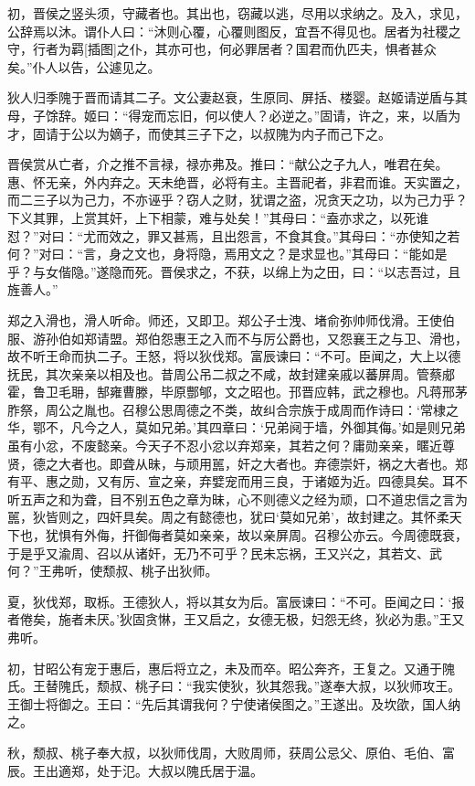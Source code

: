 \documentclass[a4paper,12pt,UTF8,twoside]{ctexbook}
\begin{document}
初，晋侯之竖头须，守藏者也。其出也，窃藏以逃，尽用以求纳之。及入，求见，公辞焉以沐。谓仆人曰：“沐则心覆，心覆则图反，宜吾不得见也。居者为社稷之守，行者为羁[插图]之仆，其亦可也，何必罪居者？国君而仇匹夫，惧者甚众矣。”仆人以告，公遽见之。

狄人归季隗于晋而请其二子。文公妻赵衰，生原同、屏括、楼婴。赵姬请逆盾与其母，子馀辞。姬曰：“得宠而忘旧，何以使人？必逆之。”固请，许之，来，以盾为才，固请于公以为嫡子，而使其三子下之，以叔隗为内子而己下之。

晋侯赏从亡者，介之推不言禄，禄亦弗及。推曰：“献公之子九人，唯君在矣。惠、怀无亲，外内弃之。天未绝晋，必将有主。主晋祀者，非君而谁。天实置之，而二三子以为己力，不亦诬乎？窃人之财，犹谓之盗，况贪天之功，以为己力乎？下义其罪，上赏其奸，上下相蒙，难与处矣！”其母曰：“盍亦求之，以死谁怼？”对曰：“尤而效之，罪又甚焉，且出怨言，不食其食。”其母曰：“亦使知之若何？”对曰：“言，身之文也，身将隐，焉用文之？是求显也。”其母曰：“能如是乎？与女偕隐。”遂隐而死。晋侯求之，不获，以绵上为之田，曰：“以志吾过，且旌善人。”

郑之入滑也，滑人听命。师还，又即卫。郑公子士洩、堵俞弥帅师伐滑。王使伯服、游孙伯如郑请盟。郑伯怨惠王之入而不与厉公爵也，又怨襄王之与卫、滑也，故不听王命而执二子。王怒，将以狄伐郑。富辰谏曰：“不可。臣闻之，大上以德抚民，其次亲亲以相及也。昔周公吊二叔之不咸，故封建亲戚以蕃屏周。管蔡郕霍，鲁卫毛耼，郜雍曹滕，毕原酆郇，文之昭也。邘晋应韩，武之穆也。凡蒋邢茅胙祭，周公之胤也。召穆公思周德之不类，故纠合宗族于成周而作诗曰：‘常棣之华，鄂不，凡今之人，莫如兄弟。’其四章曰：‘兄弟阋于墙，外御其侮。’如是则兄弟虽有小忿，不废懿亲。今天子不忍小忿以弃郑亲，其若之何？庸勋亲亲，暱近尊贤，德之大者也。即聋从昧，与顽用嚚，奸之大者也。弃德崇奸，祸之大者也。郑有平、惠之勋，又有厉、宣之亲，弃嬖宠而用三良，于诸姬为近。四德具矣。耳不听五声之和为聋，目不别五色之章为昧，心不则德义之经为顽，口不道忠信之言为嚚，狄皆则之，四奸具矣。周之有懿德也，犹曰‘莫如兄弟’，故封建之。其怀柔天下也，犹惧有外侮，扞御侮者莫如亲亲，故以亲屏周。召穆公亦云。今周德既衰，于是乎又渝周、召以从诸奸，无乃不可乎？民未忘祸，王又兴之，其若文、武何？”王弗听，使颓叔、桃子出狄师。

夏，狄伐郑，取栎。王德狄人，将以其女为后。富辰谏曰：“不可。臣闻之曰：‘报者倦矣，施者未厌。’狄固贪惏，王又启之，女德无极，妇怨无终，狄必为患。”王又弗听。

初，甘昭公有宠于惠后，惠后将立之，未及而卒。昭公奔齐，王复之。又通于隗氏。王替隗氏，颓叔、桃子曰：“我实使狄，狄其怨我。”遂奉大叔，以狄师攻王。王御士将御之。王曰：“先后其谓我何？宁使诸侯图之。”王遂出。及坎欿，国人纳之。

秋，颓叔、桃子奉大叔，以狄师伐周，大败周师，获周公忌父、原伯、毛伯、富辰。王出適郑，处于氾。大叔以隗氏居于温。
\end{document}

